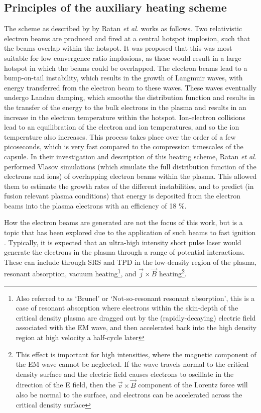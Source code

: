 \subsection{Principles of the auxiliary heating scheme}

The scheme as described by by Ratan \textit{et al.} \cite{Ratan2017} works as follows. Two relativistic electron beams are produced and fired at a central hotspot implosion, such that the beams overlap within the hotspot. It was proposed that this was most suitable for low convergence ratio implosions, as these would result in a large hotspot in which the beams could be overlapped. The electron beams lead to a bump-on-tail instability, which results in the growth of Langmuir waves, with energy transferred from the electron beam to these waves. These waves eventually undergo Landau damping, which smooths the distribution function and results in the transfer of the energy to the bulk electrons in the plasma and results in an increase in the electron temperature within the hotspot. Ion-electron collisions lead to an equilibration of the electron and ion temperatures, and so the ion temperature also increases. This process takes place over the order of a few picoseconds, which is very fast compared to the compression timescales of the capsule. In their investigation and description of this heating scheme, Ratan \textit{et al.} performed Vlasov simulations (which simulate the full distribution function of the electrons and ions) of overlapping electron beams within the plasma. This allowed them to estimate the growth rates of the different instabilities, and to predict (in fusion relevant plasma conditions) that energy is deposited from the electron beams into the plasma electrons with an efficiency of 18 \%.

How the electron beams are generated are not the focus of this work, but is a topic that has been explored  due to the application of such beams to fast ignition \cite{Tabak2005, Kemp2014}. Typically, it is expected that an ultra-high intensity short pulse laser would generate the electrons in the plasma through a range of potential interactions. These can include through SRS and TPD in the low-density region of the plasma,  resonant absorption, vacuum heating\footnote{Also referred to as `Brunel' or `Not-so-resonant resonant absorption', this is a case of resonant absorption where electrons within the skin-depth of the critical density plasma are dragged out by the (rapidly-decaying) electric field associated with the EM wave, and then accelerated back into the high density region at high velocity a half-cycle later}, and $\vec{j} \times \vec{B}$ heating\footnote{This effect is important for high intensities, where the magnetic component of the EM wave cannot be neglected. If the wave travels normal to the critical density surface and the electric field causes electrons to oscillate in the direction of the E field, then the $\vec{v} \times \vec{B}$ component of the Lorentz force will also be normal to the surface, and electrons can be accelerated across the critical density surface}\cite{Wilks1997}.

